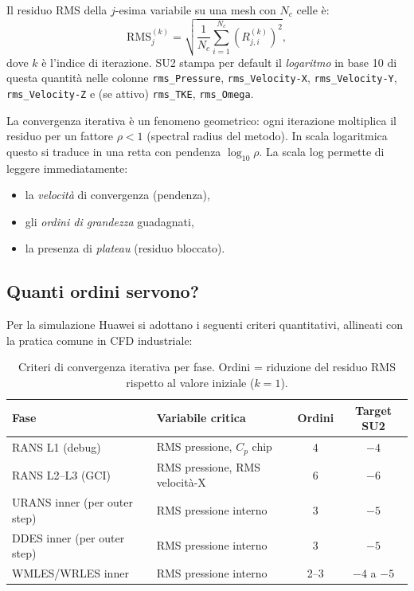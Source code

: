 \documentclass[11pt,a4paper]{article}
\newcommand{\ttcfg}[1]{\texttt{\color{codegray}#1}}
\begin{document}
Il residuo RMS della $j$-esima variabile su una mesh con $N_c$ celle è:
\begin{equation}
  \mathrm{RMS}_j^{(k)} = \sqrt{\frac{1}{N_c}\sum_{i=1}^{N_c}
    \left(R_{j,i}^{(k)}\right)^2},
\end{equation}
dove $k$ è l'indice di iterazione. SU2 stampa per default il
\emph{logaritmo} in base 10 di questa quantità nelle colonne
\ttcfg{rms\_Pressure}, \ttcfg{rms\_Velocity-X}, \ttcfg{rms\_Velocity-Y},
\ttcfg{rms\_Velocity-Z} e (se attivo) \ttcfg{rms\_TKE},
\ttcfg{rms\_Omega}.

\begin{infobox}
La convergenza iterativa è un fenomeno geometrico: ogni iterazione
moltiplica il residuo per un fattore $\rho < 1$ (spectral radius del
metodo). In scala logaritmica questo si traduce in una retta con
pendenza $\log_{10}\rho$. La scala log permette di leggere
immediatamente:
\begin{itemize}
  \item la \emph{velocità} di convergenza (pendenza),
  \item gli \emph{ordini di grandezza} guadagnati,
  \item la presenza di \emph{plateau} (residuo bloccato).
\end{itemize}
\end{infobox}

\subsection{Quanti ordini servono?}

Per la simulazione Huawei si adottano i seguenti criteri quantitativi,
allineati con la pratica comune in CFD industriale:

\begin{table}[H]
  \centering
  \caption{Criteri di convergenza iterativa per fase. Ordini = riduzione
    del residuo RMS rispetto al valore iniziale ($k=1$).}
  \label{tab:convcrit}
  \begin{tabularx}{\textwidth}{lXcc}
    \toprule
    \rowcolor{tablehead}
    \textbf{Fase} & \textbf{Variabile critica} & \textbf{Ordini} &
      \textbf{Target SU2} \\
    \midrule
    RANS L1 (debug) & RMS pressione, $C_p$ chip & 4 & $-4$ \\
    RANS L2--L3 (GCI) & RMS pressione, RMS velocità-X & 6 & $-6$ \\
    URANS inner (per outer step) & RMS pressione interno & 3 & $-5$ \\
    DDES inner (per outer step) & RMS pressione interno & 3 & $-5$ \\
    WMLES/WRLES inner & RMS pressione interno & 2--3 & $-4$ a $-5$ \\
    \bottomrule
  \end{tabularx}
\end{table}
\end{document}
